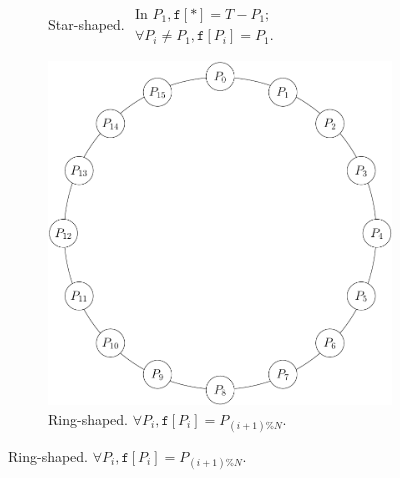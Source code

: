 \documentclass{article}
\begin{document}
\begin{figure}
\begin{subfigure}[t]{0.3\textwidth}
    \caption{Star-shaped.  \newline $\begin{array}{l} \mbox{In $P_1$}, \mathtt{f}[*] = T-P_1; \\ \mbox{$\forall P_i\neq P_1$}, \mathtt{f}[P_i] = P_1. \end{array}$}
    \label{fig:star}
  \end{subfigure}
  \hfill
  \begin{subfigure}[t]{0.3\textwidth}
    \centering
    \includegraphics[width=\textwidth]{ring}
    \caption{Ring-shaped. \newline $\forall P_i, \mathtt{f}[P_i]=P_{(i+1)\%N}$.}
    \label{fig:ring}
  \end{subfigure}
\end{figure}%
\end{document}
